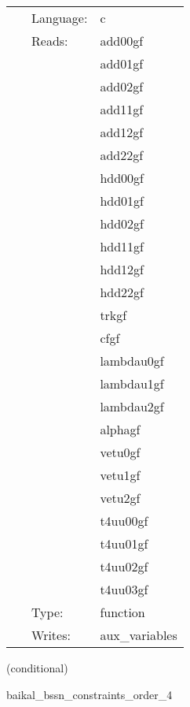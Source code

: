  \begin{tabular*}{160mm}{cll} 
~ & Language:  & c \\ 
~ & Reads:  & add00gf \\ 
~& ~ &add01gf\\ 
~& ~ &add02gf\\ 
~& ~ &add11gf\\ 
~& ~ &add12gf\\ 
~& ~ &add22gf\\ 
~& ~ &hdd00gf\\ 
~& ~ &hdd01gf\\ 
~& ~ &hdd02gf\\ 
~& ~ &hdd11gf\\ 
~& ~ &hdd12gf\\ 
~& ~ &hdd22gf\\ 
~& ~ &trkgf\\ 
~& ~ &cfgf\\ 
~& ~ &lambdau0gf\\ 
~& ~ &lambdau1gf\\ 
~& ~ &lambdau2gf\\ 
~& ~ &alphagf\\ 
~& ~ &vetu0gf\\ 
~& ~ &vetu1gf\\ 
~& ~ &vetu2gf\\ 
~& ~ &t4uu00gf\\ 
~& ~ &t4uu01gf\\ 
~& ~ &t4uu02gf\\ 
~& ~ &t4uu03gf\\ 
~ & Type:  & function \\ 
~ & Writes:  & aux\_variables \\ 
\end{tabular*} 


\vspace{5mm}

   (conditional) 

\hspace{5mm} baikal\_bssn\_constraints\_order\_4 

\hspace{5mm}{\it compute bssn (hamiltonian and momentum) constraints, at finite-differencing order 4 } 


\hspace{5mm}

